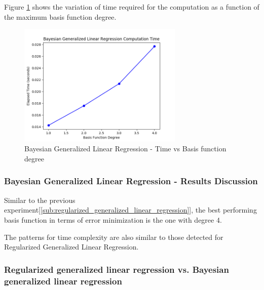 \documentclass[parskip=full]{scrartcl}
\begin{document}
        Figure \ref{fig:bglg_time_v_deg} shows the variation of time required for the computation as a function of the maximum basis function degree.

        \begin{figure}[ht]
            \centering
            \includegraphics[width=0.7\textwidth]{3b_degree_vs_time.png}
            \caption{Bayesian Generalized Linear Regression - Time vs Basis function degree}
            \label{fig:bglg_time_v_deg}
        \end{figure}

        \subsubsection*{Bayesian Generalized Linear Regression - Results Discussion} %
        \label{ssub:bayesian_generalized_linear_regression_results_discussion}

            Similar to the previous experiment[\ref{sub:regularized_generalized_linear_regression}], the best performing basis function in terms of error minimization is the one with degree 4.

            The patterns for time complexity are also similar to those detected for Regularized Generalized Linear Regression. 
        

        \subsubsection*{Regularized generalized linear regression vs. Bayesian generalized linear regression} %
        \label{ssub:regularized_generalized_linear_regression_vs_bayesian_generalized_linear_regression}
\end{document}
